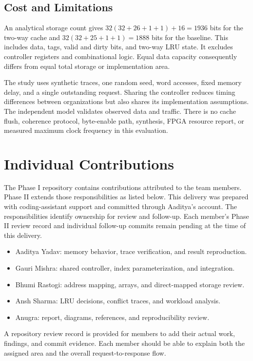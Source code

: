 \documentclass[conference]{IEEEtran}
\begin{document}
\subsection{Cost and Limitations}
An analytical storage count gives $32(32+26+1+1)+16=1936$ bits for the two-way
cache and $32(32+25+1+1)=1888$ bits for the baseline. This includes data, tags,
valid and dirty bits, and two-way LRU state. It excludes controller registers
and combinational logic. Equal data capacity consequently differs from equal
total storage or implementation area.

The study uses synthetic traces, one random seed, word accesses, fixed memory
delay, and a single outstanding request. Sharing the controller reduces
timing differences between organizations but also shares its implementation
assumptions. The independent model validates observed data and traffic.
There is no cache flush, coherence protocol, byte-enable path, synthesis,
FPGA resource report, or measured maximum clock frequency in this evaluation.

\newpage
\balance
\section{Individual Contributions}
The Phase I repository contains contributions attributed to the team members.
Phase II extends those responsibilities as listed below. This delivery was
prepared with coding-assistant support and committed through Aaditya's account.
The responsibilities identify ownership for review and follow-up. Each member's
Phase II review record and individual follow-up commits remain pending at
the time of this delivery.
\begin{itemize}
\item Aaditya Yadav: memory behavior, trace verification, and result reproduction.
\item Gauri Mishra: shared controller, index parameterization, and integration.
\item Bhumi Rastogi: address mapping, arrays, and direct-mapped storage review.
\item Ansh Sharma: LRU decisions, conflict traces, and workload analysis.
\item Anugra: report, diagrams, references, and reproducibility review.
\end{itemize}
A repository review record is provided for members to add their actual work,
findings, and commit evidence. Each member should be able to explain both
the assigned area and the overall request-to-response flow.
\end{document}
